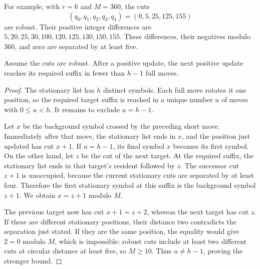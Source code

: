 For example, with $r=6$ and $M=360$, the cuts
\[
 (q_0,q_1,q_2,q_3,q_4)=(0,5,25,125,155)
\]
are robust. Their positive integer differences are
$5,20,25,30,100,120,125,130,150,155$. These differences, their negatives
modulo $360$, and zero are separated by at least five.

\begin{lemma}
\label{geo:proper-run}
Assume the cuts are robust. After a positive update, the next positive
update reaches its required suffix in fewer than $h-1$ full moves.
\end{lemma}
\begin{proof}
The stationary list has $h$ distinct symbols. Each full move rotates it
one position, so the required target suffix is reached in a unique number
$u$ of moves with $0\leq u<h$. It remains to exclude $u=h-1$.

Let $x$ be the background symbol crossed by the preceding short move.
Immediately after that move, the stationary list ends in $x$, and the
position just updated has cut $x+1$. If $u=h-1$, its final symbol $x$
becomes its first symbol. On the other hand, let $z$ be the cut of the
next target. At the required suffix, the stationary list ends in that
target's resident followed by $z$. The successor cut $z+1$ is unoccupied,
because the current stationary cuts are separated by at least four.
Therefore the first stationary symbol at this suffix is the background
symbol $z+1$. We obtain $x=z+1$ modulo $M$.

The previous target now has cut $x+1=z+2$, whereas the next target has
cut $z$. If these are different stationary positions, their distance two
contradicts the separation just stated. If they are the same position,
the equality would give $2=0$ modulo $M$, which is impossible: robust
cuts include at least two different cuts at circular distance at least
five, so $M\geq10$. Thus $u\ne h-1$, proving the stronger bound.
\end{proof}

